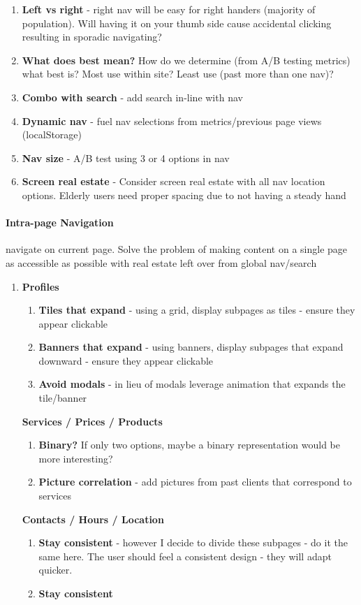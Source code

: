 \begin{enumerate}
\begin{enumerate}
  \item
    \textbf{Left vs right} - right nav will be easy for right handers (majority of population). Will having it on your thumb side cause accidental clicking resulting in sporadic navigating?
  \item
    \textbf{What does best mean?} How do we determine (from A/B testing metrics) what best is? Most use within site? Least use (past more than one nav)?
  \item
    \textbf{Combo with search} - add search in-line with nav
  \item
    \textbf{Dynamic nav} - fuel nav selections from metrics/previous page views (localStorage)
  \item
    \textbf{Nav size} - A/B test using 3 or 4 options in nav
  \item
    \textbf{Screen real estate} - Consider screen real estate with all nav location options. Elderly users need proper spacing due to not having a steady hand
  \end{enumerate}
\end{enumerate}

\paragraph{Intra-page Navigation} navigate on current page. Solve the problem of making content on a single page as accessible as possible with real estate left over from global nav/search

\begin{enumerate}
\item
  \textbf{Profiles}
  \begin{enumerate}
  \item
    \textbf{Tiles that expand} - using a grid, display subpages as tiles - ensure they appear clickable
  \item
    \textbf{Banners that expand} - using banners, display subpages that expand downward - ensure they appear clickable
  \item
    \textbf{Avoid modals} - in lieu of modals leverage animation that expands the tile/banner
  \end{enumerate}
  \textbf{Services / Prices / Products}
  \begin{enumerate}
  \item
    \textbf{Binary?} If only two options, maybe a binary representation would be more interesting?
  \item
    \textbf{Picture correlation} - add pictures from past clients that correspond to services
  \end{enumerate}
  \textbf{Contacts / Hours / Location}
  \begin{enumerate}
  \item
    \textbf{Stay consistent} - however I decide to divide these subpages - do it the same here. The user should feel a consistent design - they will adapt quicker.
  \item
    \textbf{Stay consistent}
  \end{enumerate}
\end{enumerate}



